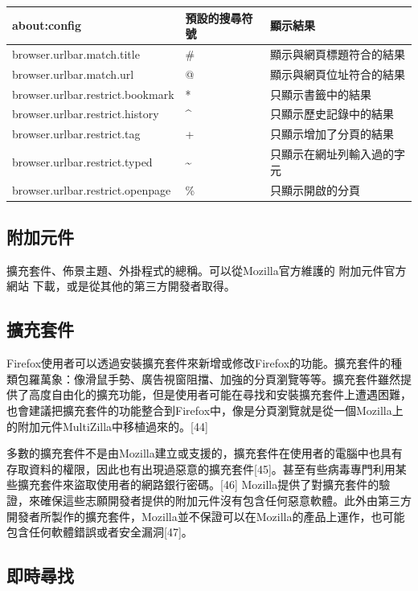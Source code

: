 \documentclass[12pt]{article}
\begin{document}
\begin{adjustbox}{center}
\footnotesize\linespread{1.2}\centering\begin{tabular}{lll} \hline
about:config &  預設的搜尋符號 & 顯示結果\\ \hline
browser.urlbar.match.title & \# & 顯示與網頁標題符合的結果\\
browser.urlbar.match.url & @ & 顯示與網頁位址符合的結果\\
browser.urlbar.restrict.bookmark & * & 只顯示書籤中的結果\\
browser.urlbar.restrict.history & \^{} & 只顯示歷史記錄中的結果\\
browser.urlbar.restrict.tag & + & 只顯示增加了分頁的結果\\
browser.urlbar.restrict.typed & \~{} & 只顯示在網址列輸入過的字元\\
browser.urlbar.restrict.openpage & \% & 只顯示開啟的分頁\\ \hline
\end{tabular}
\end{adjustbox}

\subsection{附加元件}

擴充套件、佈景主題、外掛程式的總稱。可以從Mozilla官方維護的 附加元件官方網站 下載，或是從其他的第三方開發者取得。

\subsection{擴充套件}

Firefox使用者可以透過安裝擴充套件來新增或修改Firefox的功能。擴充套件的種類包羅萬象：像滑鼠手勢、廣告視窗阻擋、加強的分頁瀏覽等等。擴充套件雖然提供了高度自由化的擴充功能，但是使用者可能在尋找和安裝擴充套件上遭遇困難，也會建議把擴充套件的功能整合到Firefox中，像是分頁瀏覽就是從一個Mozilla上的附加元件MultiZilla中移植過來的。[44]

多數的擴充套件不是由Mozilla建立或支援的，擴充套件在使用者的電腦中也具有存取資料的權限，因此也有出現過惡意的擴充套件[45]。甚至有些病毒專門利用某些擴充套件來盜取使用者的網路銀行密碼。[46] Mozilla提供了對擴充套件的驗證，來確保這些志願開發者提供的附加元件沒有包含任何惡意軟體。此外由第三方開發者所製作的擴充套件，Mozilla並不保證可以在Mozilla的產品上運作，也可能包含任何軟體錯誤或者安全漏洞[47]。

\subsection{即時尋找}
\end{document}

